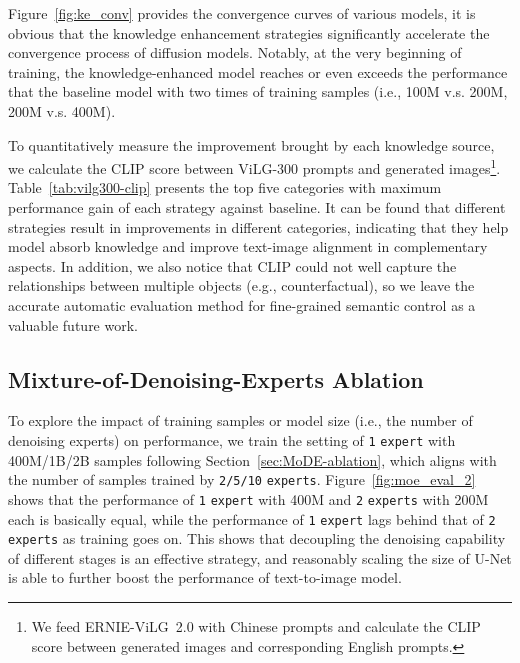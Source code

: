 \documentclass[10pt,twocolumn,letterpaper]{article}
\begin{document}
Figure~\ref{fig:ke_conv} provides the convergence curves of various models, it is obvious that the knowledge enhancement strategies significantly accelerate the convergence process of diffusion models.
Notably, at the very beginning of training, the knowledge-enhanced model reaches or even exceeds the performance that the baseline model with two times of training samples (i.e., 100M v.s. 200M, 200M v.s. 400M).

To quantitatively measure the improvement brought by each knowledge source, we calculate the CLIP score between ViLG-300 prompts and generated images\footnote{We feed ERNIE-ViLG~2.0 with Chinese prompts and calculate the CLIP score between generated images and corresponding English prompts.}. Table~\ref{tab:vilg300-clip} presents the top five categories with maximum performance gain of each strategy against baseline. It can be found that different strategies result in improvements in different categories, indicating that they help model absorb knowledge and improve text-image alignment in complementary aspects.
In addition, we also notice that CLIP could not well capture the relationships between multiple objects (e.g., counterfactual), so we leave the accurate automatic evaluation method for fine-grained semantic control as a valuable future work.

\subsection{Mixture-of-Denoising-Experts Ablation}\label{appx:moe_ablation}

To explore the impact of training samples or model size (i.e., the number of denoising experts) on performance, we train the setting of \verb|1| \verb|expert| with 400M/1B/2B samples following Section~\ref{sec:MoDE-ablation}, which aligns with the number of samples trained by \verb|2/5/10| \verb|experts|.
Figure~\ref{fig:moe_eval_2} shows that the performance of \verb|1| \verb|expert| with 400M and \verb|2| \verb|experts| with 200M each is basically equal, while the performance of \verb|1| \verb|expert| lags behind that of \verb|2| \verb|experts| as training goes on.
This shows that decoupling the denoising capability of different stages is an effective strategy, and reasonably scaling the size of U-Net is able to further boost the performance of text-to-image model.
\end{document}
